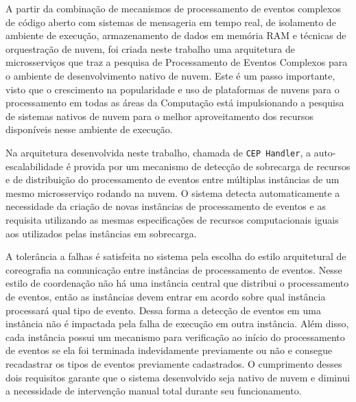 A partir da combinação de mecanismos de processamento de eventos complexos de código aberto com sistemas de mensageria em tempo real, de isolamento de ambiente de execução, armazenamento de dados em memória RAM e técnicas de orquestração de nuvem, foi criada neste trabalho uma arquitetura de microsserviços que traz a pesquisa de Processamento de Eventos Complexos para o ambiente de desenvolvimento nativo de nuvem. Este é um passo importante, visto que o crescimento na popularidade e uso de plataformas de nuvens para o processamento em todas as áreas da Computação está impulsionando a pesquisa de sistemas nativos de nuvem para o melhor aproveitamento dos recursos disponíveis nesse ambiente de execução.

Na arquitetura desenvolvida neste trabalho, chamada de \texttt{CEP Handler}, a auto-escalabilidade é provida por um mecanismo de detecção de sobrecarga de recursos e de distribuição do processamento de eventos entre múltiplas instâncias de um mesmo microsserviço rodando na nuvem. O sistema detecta automaticamente a necessidade da criação de novas instâncias de processamento de eventos e as requisita utilizando as mesmas especificações de recursos computacionais iguais aos utilizados pelas instâncias em sobrecarga. 

A tolerância a falhas é satisfeita no sistema pela escolha do estilo arquitetural de coreografia na comunicação entre instâncias de processamento de eventos. Nesse estilo de coordenação não há uma instância central que distribui o processamento de eventos, então as instâncias devem entrar em acordo sobre qual instância processará qual tipo de evento. Dessa forma a detecção de eventos em uma instância não é impactada pela falha de execução em outra instância. Além disso, cada instância possui um mecanismo para verificação ao início do processamento de eventos se ela foi terminada indevidamente previamente ou não e consegue recadastrar os tipos de eventos previamente cadastrados. O cumprimento desses dois requisitos garante que o sistema desenvolvido seja nativo de nuvem e diminui a necessidade de intervenção manual total durante seu funcionamento. %

